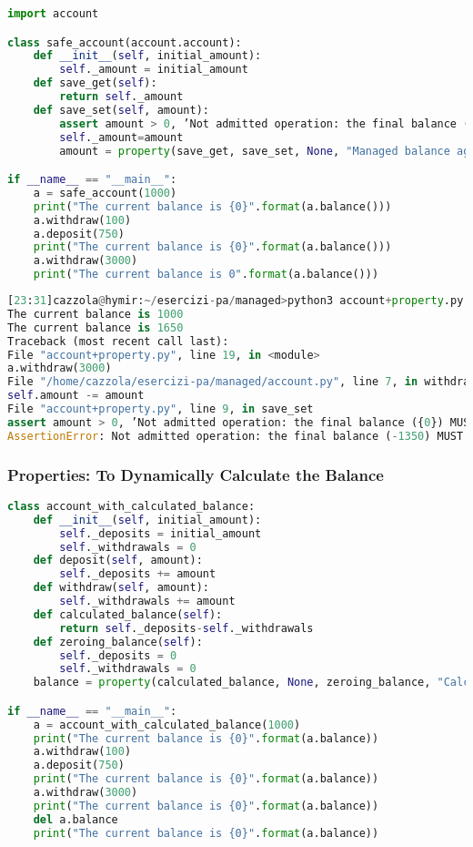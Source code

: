 \begin{lstlisting}[language=Python]
import account

class safe_account(account.account):
	def __init__(self, initial_amount):
		self._amount = initial_amount
	def save_get(self):
		return self._amount
	def save_set(self, amount):
		assert amount > 0, ’Not admitted operation: the final balance ({0}) MUST be positive’.format(amount)
		self._amount=amount
		amount = property(save_get, save_set, None, "Managed balance against excessive withdrawals")

if __name__ == "__main__":
	a = safe_account(1000)
	print("The current balance is {0}".format(a.balance()))
	a.withdraw(100)
	a.deposit(750)
	print("The current balance is {0}".format(a.balance()))
	a.withdraw(3000)
	print("The current balance is 0".format(a.balance()))
\end{lstlisting}

\begin{lstlisting}[language=Python]
[23:31]cazzola@hymir:~/esercizi-pa/managed>python3 account+property.py
The current balance is 1000
The current balance is 1650
Traceback (most recent call last):
File "account+property.py", line 19, in <module>
a.withdraw(3000)
File "/home/cazzola/esercizi-pa/managed/account.py", line 7, in withdraw
self.amount -= amount
File "account+property.py", line 9, in save_set
assert amount > 0, ’Not admitted operation: the final balance ({0}) MUST be positive’.format(amount)
AssertionError: Not admitted operation: the final balance (-1350) MUST be positive
\end{lstlisting}

\subsubsection{Properties: To Dynamically Calculate the Balance}

\begin{lstlisting}[language=Python]
class account_with_calculated_balance:
	def __init__(self, initial_amount):
		self._deposits = initial_amount
		self._withdrawals = 0
	def deposit(self, amount):
		self._deposits += amount
	def withdraw(self, amount):
		self._withdrawals += amount
	def calculated_balance(self):
		return self._deposits-self._withdrawals
	def zeroing_balance(self):
		self._deposits = 0
		self._withdrawals = 0
	balance = property(calculated_balance, None, zeroing_balance, "Calculate Balance")

if __name__ == "__main__":
	a = account_with_calculated_balance(1000)
	print("The current balance is {0}".format(a.balance))
	a.withdraw(100)
	a.deposit(750)
	print("The current balance is {0}".format(a.balance))
	a.withdraw(3000)
	print("The current balance is {0}".format(a.balance))
	del a.balance
	print("The current balance is {0}".format(a.balance))
\end{lstlisting}

